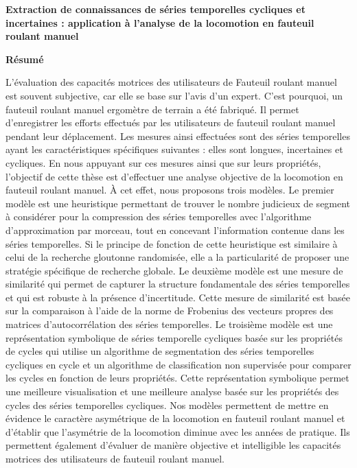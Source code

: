 \clearpage
\ifodd\thepage\hbox{}\newpage\else\fi%
\thispagestyle{empty}\parindent=0pt
{\Large \textbf{Extraction de connaissances de séries temporelles cycliques et incertaines : application à l'analyse de la locomotion en fauteuil roulant manuel}}
{\large \textbf{}}
\hrulefill%
\begin{center}
{\Large \textbf{Résumé}}
\end{center}
L'évaluation des capacités motrices des utilisateurs de Fauteuil roulant manuel est souvent subjective, car elle se base sur l'avis d'un expert. C'est pourquoi, un fauteuil roulant manuel ergomètre de terrain a été fabriqué. Il permet d'enregistrer les efforts effectués par les utilisateurs de fauteuil roulant manuel pendant leur déplacement. Les mesures ainsi effectuées sont des séries temporelles ayant les caractéristiques spécifiques suivantes : elles sont longues, incertaines et cycliques. En nous appuyant sur ces mesures ainsi que sur leurs propriétés, l'objectif de cette thèse est d'effectuer une analyse objective de la locomotion en fauteuil roulant manuel. À cet effet, nous proposons trois modèles. Le premier modèle est une heuristique permettant de trouver le nombre judicieux de segment à considérer pour la compression des séries temporelles avec l'algorithme d'approximation par morceau, tout en concevant l'information contenue dans les séries temporelles. Si le principe de fonction de cette heuristique est similaire à celui de la recherche gloutonne randomisée, elle a la particularité de proposer une stratégie spécifique de recherche globale. Le deuxième modèle est une mesure de similarité qui permet de capturer la structure fondamentale des séries temporelles et qui est robuste à la présence d'incertitude. Cette mesure de similarité est basée sur la comparaison à l'aide de la norme de Frobenius des vecteurs propres des matrices d'autocorrélation des séries temporelles. Le troisième modèle est une représentation symbolique de séries temporelle cycliques basée sur les propriétés de cycles qui utilise un algorithme de segmentation des séries temporelles cycliques en cycle et un algorithme de classification non supervisée pour comparer les cycles en fonction de leurs propriétés. Cette représentation symbolique permet une meilleure visualisation et une meilleure analyse basée sur les propriétés des cycles des séries temporelles cycliques. Nos modèles permettent de mettre en évidence le caractère asymétrique de la locomotion en fauteuil roulant manuel et d'établir que l'asymétrie de la locomotion diminue avec les années de pratique. Ils permettent également d'évaluer de manière objective et intelligible les capacités motrices des utilisateurs de fauteuil roulant manuel.

